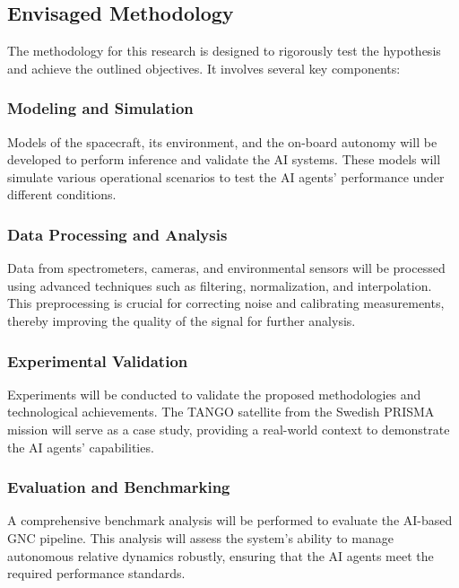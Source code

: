 \documentclass[a4paper, 11pt]{article}
\begin{document}
\subsection{Envisaged Methodology}

The methodology for this research is designed to rigorously test the hypothesis and achieve the outlined objectives. It involves several key components:

\subsubsection{Modeling and Simulation}

Models of the spacecraft, its environment, and the on-board autonomy will be developed to perform inference and validate the AI systems. These models will simulate various operational scenarios to test the AI agents' performance under different conditions.

\subsubsection{Data Processing and Analysis}

Data from spectrometers, cameras, and environmental sensors will be processed using advanced techniques such as filtering, normalization, and interpolation. This preprocessing is crucial for correcting noise and calibrating measurements, thereby improving the quality of the signal for further analysis.

\subsubsection{Experimental Validation}

Experiments will be conducted to validate the proposed methodologies and technological achievements. The TANGO satellite from the Swedish PRISMA mission will serve as a case study, providing a real-world context to demonstrate the AI agents' capabilities.

\subsubsection{Evaluation and Benchmarking}

A comprehensive benchmark analysis will be performed to evaluate the AI-based GNC pipeline. This analysis will assess the system's ability to manage autonomous relative dynamics robustly, ensuring that the AI agents meet the required performance standards.
\end{document}
